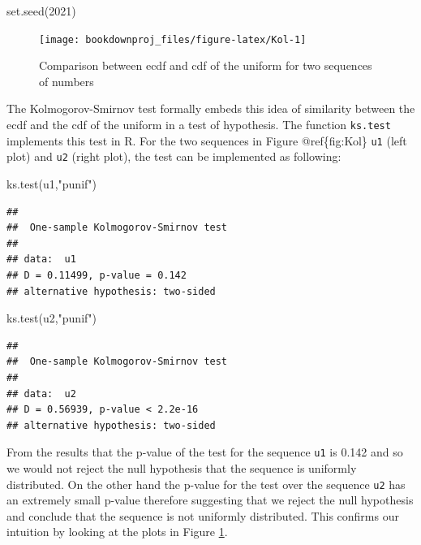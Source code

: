 \documentclass[
]{book}
\newenvironment{Shaded}{\begin{snugshade}}{\end{snugshade}}
\newcommand{\DecValTok}[1]{\textcolor[rgb]{0.00,0.00,0.81}{#1}}
\newcommand{\FunctionTok}[1]{\textcolor[rgb]{0.00,0.00,0.00}{#1}}
\newcommand{\NormalTok}[1]{#1}
\newcommand{\StringTok}[1]{\textcolor[rgb]{0.31,0.60,0.02}{#1}}
\theoremstyle{definition}
\theoremstyle{definition}
\theoremstyle{definition}
\theoremstyle{definition}
\theoremstyle{remark}
\begin{document}
\begin{Shaded}
\begin{Highlighting}[]
\FunctionTok{set.seed}\NormalTok{(}\DecValTok{2021}\NormalTok{)}
\end{Highlighting}
\end{Shaded}

\begin{figure}

{\centering \texttt{[image: bookdownproj\_files/figure-latex/Kol-1]} 

}

\caption{Comparison between ecdf and cdf of the uniform for two sequences of numbers}\label{fig:Kol}
\end{figure}

The Kolmogorov-Smirnov test formally embeds this idea of similarity between the ecdf and the cdf of the uniform in a test of hypothesis. The function \texttt{ks.test} implements this test in R. For the two sequences in Figure @ref\{fig:Kol\} \texttt{u1} (left plot) and \texttt{u2} (right plot), the test can be implemented as following:

\begin{Shaded}
\begin{Highlighting}[]
\FunctionTok{ks.test}\NormalTok{(u1,}\StringTok{"punif"}\NormalTok{)}
\end{Highlighting}
\end{Shaded}

\begin{verbatim}
## 
##  One-sample Kolmogorov-Smirnov test
## 
## data:  u1
## D = 0.11499, p-value = 0.142
## alternative hypothesis: two-sided
\end{verbatim}

\begin{Shaded}
\begin{Highlighting}[]
\FunctionTok{ks.test}\NormalTok{(u2,}\StringTok{"punif"}\NormalTok{)}
\end{Highlighting}
\end{Shaded}

\begin{verbatim}
## 
##  One-sample Kolmogorov-Smirnov test
## 
## data:  u2
## D = 0.56939, p-value < 2.2e-16
## alternative hypothesis: two-sided
\end{verbatim}

From the results that the p-value of the test for the sequence \texttt{u1} is 0.142 and so we would not reject the null hypothesis that the sequence is uniformly distributed. On the other hand the p-value for the test over the sequence \texttt{u2} has an extremely small p-value therefore suggesting that we reject the null hypothesis and conclude that the sequence is not uniformly distributed. This confirms our intuition by looking at the plots in Figure \ref{fig:Kol}.
\end{document}
